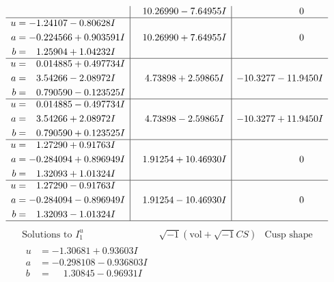 \documentclass[1p]{elsarticle_modified}
\theoremstyle{definition}
\newcommand{\I}{\sqrt{-1}}
\begin{document}
$$\begin{array}{c|c|c}
 & \phantom{-}10.26990 - 7.64955 I & \phantom{-0.000000 } 0 \\ \hline\begin{aligned}
u &= -1.24107 - 0.80628 I \\
a &= -0.224566 + 0.903591 I \\
b &= \phantom{-}1.25904 + 1.04232 I\end{aligned}
 & \phantom{-}10.26990 + 7.64955 I & \phantom{-0.000000 } 0 \\ \hline\begin{aligned}
u &= \phantom{-}0.014885 + 0.497734 I \\
a &= \phantom{-}3.54266 - 2.08972 I \\
b &= \phantom{-}0.790590 - 0.123525 I\end{aligned}
 & \phantom{-}4.73898 + 2.59865 I & -10.3277 - 11.9450 I \\ \hline\begin{aligned}
u &= \phantom{-}0.014885 - 0.497734 I \\
a &= \phantom{-}3.54266 + 2.08972 I \\
b &= \phantom{-}0.790590 + 0.123525 I\end{aligned}
 & \phantom{-}4.73898 - 2.59865 I & -10.3277 + 11.9450 I \\ \hline\begin{aligned}
u &= \phantom{-}1.27290 + 0.91763 I \\
a &= -0.284094 + 0.896949 I \\
b &= \phantom{-}1.32093 + 1.01324 I\end{aligned}
 & \phantom{-}1.91254 + 10.46930 I & \phantom{-0.000000 } 0 \\ \hline\begin{aligned}
u &= \phantom{-}1.27290 - 0.91763 I \\
a &= -0.284094 - 0.896949 I \\
b &= \phantom{-}1.32093 - 1.01324 I\end{aligned}
 & \phantom{-}1.91254 - 10.46930 I & \phantom{-0.000000 } 0\\
 \hline 
 \end{array}$$\newpage$$\begin{array}{c|c|c}  
\text{Solutions to }I^u_{1}& \I (\text{vol} + \sqrt{-1}CS) & \text{Cusp shape}\\
 \hline 
\begin{aligned}
u &= -1.30681 + 0.93603 I \\
a &= -0.298108 - 0.936803 I \\
b &= \phantom{-}1.30845 - 0.96931 I\end{aligned}

\end{array}$$
\end{document}
